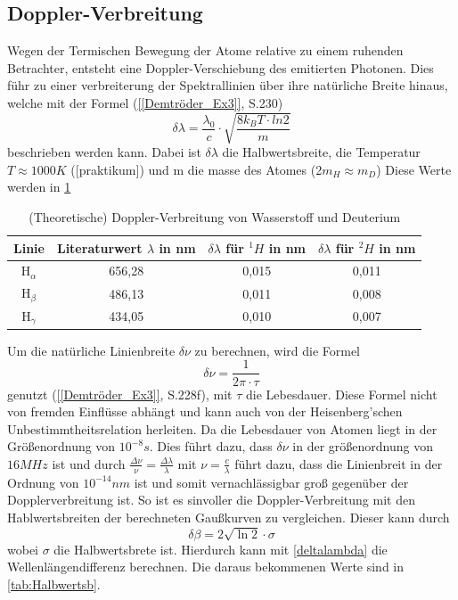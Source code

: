 \subsection{Doppler-Verbreitung}

Wegen der Termischen Bewegung der Atome relative zu einem ruhenden Betrachter, entsteht eine Doppler-Verschiebung des emitierten Photonen. 
Dies führ zu einer verbreiterung der Spektrallinien über ihre natürliche Breite hinaus, welche mit der Formel (\cref{[Demtröder_Ex3]}, S.230)
\begin{equation}
    \delta\lambda = \frac{\lambda_0}{c}\cdot \sqrt{\frac{8k_BT\cdot ln2}{m}}
\end{equation}
beschrieben werden kann.
Dabei ist $\delta\lambda$ die Halbwertsbreite, die Temperatur $T \approx 1000K$ ([praktikum]) und m die masse des Atomes (2$m_H \approx m_D$)
Diese Werte werden in \cref{tab:dopplerTemp}
\begin{table}[htbp]
    \centering
    \begin{tabular}{|c|c|c|c|}
    \hline
    Linie & Literaturwert $\lambda$ in nm & $\delta\lambda$ für $^1H$ in nm & $\delta\lambda$ für $^2H$ in nm \\
    \midrule
    H$_\alpha$ & 656,28 & 0,015 & 0,011 \\
    H$_\beta$ & 486,13 & 0,011 & 0,008 \\
    H$_\gamma$  & 434,05 & 0,010 & 0,007 \\
    \hline
    \end{tabular}
    \caption{(Theoretische) Doppler-Verbreitung von Wasserstoff und Deuterium}
    \label{tab:dopplerTemp}
\end{table}

Um die natürliche Linienbreite $\delta\nu$ zu berechnen, wird die Formel
\begin{equation}
    \delta \nu = \frac{1}{2\pi \cdot \tau}
\end{equation}
genutzt (\cref{[Demtröder_Ex3]}, S.228f), mit $\tau$ die Lebesdauer. 
Diese Formel nicht von fremden Einflüsse abhängt und kann auch von der Heisenberg'schen Unbestimmtheitsrelation herleiten.  
Da die Lebesdauer von Atomen liegt in der Größenordnung von $10^{-8}s$. 
Dies führt dazu, dass $\delta\nu$ in der größenordnung von $16MHz$  ist und durch $\frac{\Delta\nu}{\nu} = \frac{\Delta\lambda}{\lambda}$ mit $\nu = \frac{c}{\lambda}$ führt dazu, dass die Linienbreit in der Ordnung von $10^{-14}nm$ ist und somit vernachlässigbar groß gegenüber der Dopplerverbreitung ist.
So ist es sinvoller die Doppler-Verbreitung mit den Hablwertsbreiten der berechneten Gaußkurven zu vergleichen.
Dieser kann durch 
\begin{equation}
    \delta\beta = 2\sqrt{\ln{2}}\cdot \sigma
\end{equation}
wobei $\sigma$ die Halbwertsbrete ist.
Hierdurch kann mit \cref{deltalambda} die Wellenlängendifferenz berechnen.
Die daraus bekommenen Werte sind in \cref{tab:Halbwertsb}.


